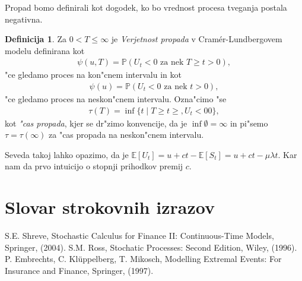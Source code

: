 \documentclass[12pt, a4paper, reqno]{amsart}
\theoremstyle{definition} %
\newtheorem{definicija}{Definicija}[section]
\theoremstyle{plain} %
\newcommand{\geslo}[2]{\noindent\textbf{#1}\hspace*{3mm}\hangindent=\parindent\hangafter=1 #2}
\newcommand{\E}{\mathbb{E}}
\newcommand{\Prob}{\mathbb{P}}
\newcommand{\1}{\mathds{1}}
\begin{document}
    Propad bomo definirali kot dogodek, ko bo vrednost procesa tveganja postala negativna.

    \begin{definicija}
        Za $0<T\leq\infty$ je \textit{Verjetnost propada} v Cramér-Lundbergovem modelu definirana kot
        \begin{align*}
            \psi(u, T) = \Prob(U_t < 0 \text{ za nek } T \geq t > 0), 
        \end{align*}
        "ce gledamo proces na kon"cnem intervalu in kot
        \begin{align*}
            \psi(u) = \Prob(U_t < 0 \text{ za nek } t > 0),
        \end{align*}
        "ce gledamo proces na neskon"cnem intervalu. Ozna"cimo "se 
        \begin{align*}
            \tau(T)=\inf\{t\mid T\geq t\geq, U_t <0 0\}, 
        \end{align*}
        kot \textit{"cas propada}, kjer se dr"zimo konvencije, da je $\inf\emptyset = \infty$ in 
        pi"semo $\tau = \tau(\infty)$ za "cas propada na neskon"cnem intervalu.
        \label{def:verjetnostPropadaInCasiPropada}   
    \end{definicija}

    Seveda takoj lahko opazimo, da je $\E\left[U_t\right] = u + ct - \E\left[S_t\right] = u + ct - \mu\lambda t$.
    Kar nam da prvo intuicijo o stopnji prihodkov premij $c$.



















\section*{Slovar strokovnih izrazov}

%
%


\begin{thebibliography}{99}

S.E. Shreve, Stochastic Calculus for Finance II: Continuous-Time Models, Springer, (2004).
S.M. Ross, Stochatic Processes: Second Edition, Wiley, (1996).
P. Embrechts, C. Klüppelberg, T. Mikosch, Modelling Extremal Events: For Insurance and Finance, Springer, (1997).
\end{thebibliography}
\end{document}
